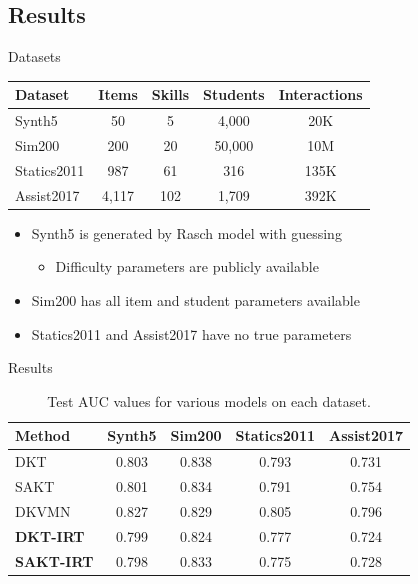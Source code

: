 \documentclass{beamer}
\theoremstyle{definition}
\begin{document}
\subsection{Results}
\begin{frame}{Datasets}
\begin{table}
  \centering
  \begin{tabular}{l c c c c}
    \hline
    Dataset & Items & Skills & Students & Interactions \\
    \hline
    Synth5 & 50 & 5 & 4,000 & 20K \\
    Sim200 & 200 & 20 & 50,000 & 10M \\
    Statics2011 & 987 & 61 & 316 & 135K \\
    Assist2017 & 4,117 & 102 & 1,709 & 392K \\
  \end{tabular}
\end{table}

\begin{itemize}
  \item Synth5 is generated by Rasch model with guessing
    \begin{itemize}
      \item Difficulty parameters are publicly available
    \end{itemize}
  \item Sim200 has all item and student parameters available
  \item Statics2011 and Assist2017 have no true parameters
\end{itemize}
\end{frame}

\begin{frame}{Results}
\begin{table}
  \centering
  \begin{tabular}{l c c c c}
    \hline
    Method & Synth5 & Sim200 & Statics2011 & Assist2017 \\
    \hline 
    DKT & 0.803 & 0.838 & 0.793 & 0.731 \\
    SAKT & 0.801 & 0.834 & 0.791  & 0.754 \\
    DKVMN & 0.827 & 0.829 & 0.805 & 0.796 \\
    \textbf{DKT-IRT} & 0.799 & 0.824 & 0.777 & 0.724 \\
    \textbf{SAKT-IRT} & 0.798 & 0.833 & 0.775 & 0.728
  \end{tabular}
  \caption*{Test AUC values for various models on each dataset.}
  \label{tab:kt_results}
\end{table}

\end{frame}
\end{document}
